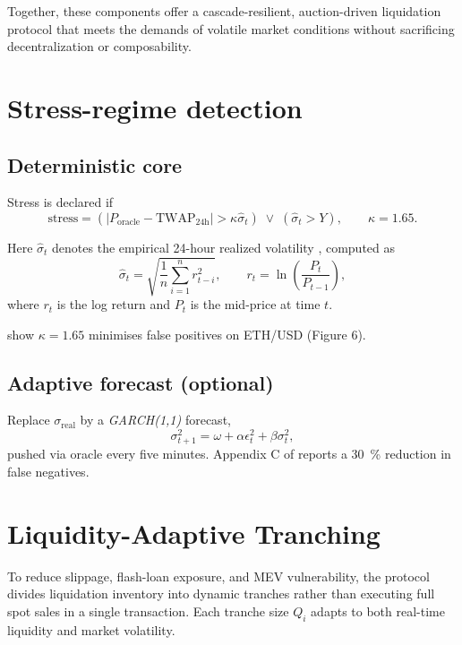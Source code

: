\documentclass[11pt]{article}
\begin{document}
\noindent
Together, these components offer a cascade-resilient, auction-driven liquidation protocol that meets the demands of volatile market conditions without sacrificing decentralization or composability.


\section{Stress-regime detection}
\label{sec:stress}

\subsection{Deterministic core}

Stress is declared if
\begin{equation}\label{eq:stress-core}
\text{stress} =
\left( \left| P_{\text{oracle}} - \text{TWAP}_{24\mathrm{h}} \right| > \kappa \widehat{\sigma}_{t} \right)
\;\lor\;
\left( \widehat{\sigma}_{t} > Y \right),
\qquad \kappa = 1.65.
\end{equation}

Here \( \widehat{\sigma}_t \) denotes the empirical 24-hour realized volatility \parencite{andersen2003realized}, computed as
\begin{equation}
\widehat{\sigma}_{t} = \sqrt{\frac{1}{n} \sum_{i=1}^{n} r_{t-i}^2}, 
\qquad
r_t = \ln\left( \frac{P_t}{P_{t-1}} \right),
\end{equation}
where \( r_t \) is the log return and \( P_t \) is the mid-price at time \( t \).


\parencite{tian2025defi} show $\kappa = 1.65$ minimises false positives on
ETH/USD (Figure 6).

\subsection{Adaptive forecast (optional)}
Replace $\sigma_{\text{real}}$ by a \emph{GARCH(1,1)} forecast,
\[
\sigma_{t+1}^2 = \omega + \alpha \epsilon_t^2 + \beta \sigma_t^2,
\]
pushed via oracle every five minutes.  
Appendix C of \citeauthor{tian2025defi} reports a
\SI{30}{\percent} reduction in false negatives.

\section{Liquidity-Adaptive Tranching}
\label{sec:tranch}
To reduce slippage, flash-loan exposure, and MEV vulnerability, the protocol divides liquidation inventory into dynamic tranches rather than executing full spot sales in a single transaction. Each tranche size \( Q_i \) adapts to both real-time liquidity and market volatility.
\end{document}
